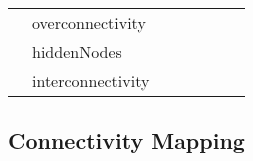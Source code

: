\begin{table}[]
{\begin{tabular}{lllllll}
                                                                                             & overconnectivity   &                                                                                   &                                                                             &                                                                                 &                                                                          & ~\cite{RN77}                  \\
                                                                                             & hiddenNodes        &                                                                                   &                                                                             &                                                                                 &                                                                          &                               \\
                                                                                             & interconnectivity  &                                                                                   &                                                                             &                                                                                 &                                                                          & ~\cite{RN78}                  \\ \hline
\end{tabular}%
}
\end{table}

\subsection{Connectivity Mapping} %
\label{sub:connectivity_mapping}

